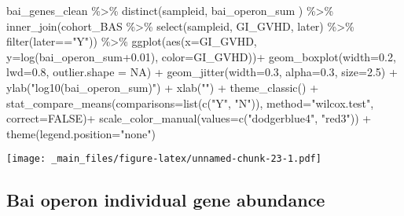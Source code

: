 \documentclass[
]{book}
\newenvironment{Shaded}{\begin{snugshade}}{\end{snugshade}}
\newcommand{\AttributeTok}[1]{\textcolor[rgb]{0.77,0.63,0.00}{#1}}
\newcommand{\ConstantTok}[1]{\textcolor[rgb]{0.00,0.00,0.00}{#1}}
\newcommand{\FloatTok}[1]{\textcolor[rgb]{0.00,0.00,0.81}{#1}}
\newcommand{\FunctionTok}[1]{\textcolor[rgb]{0.00,0.00,0.00}{#1}}
\newcommand{\NormalTok}[1]{#1}
\newcommand{\SpecialCharTok}[1]{\textcolor[rgb]{0.00,0.00,0.00}{#1}}
\newcommand{\StringTok}[1]{\textcolor[rgb]{0.31,0.60,0.02}{#1}}
\begin{document}
\begin{Shaded}
\begin{Highlighting}[]
\NormalTok{bai\_genes\_clean }\SpecialCharTok{\%\textgreater{}\%} 
  \FunctionTok{distinct}\NormalTok{(sampleid, bai\_operon\_sum ) }\SpecialCharTok{\%\textgreater{}\%} 
  \FunctionTok{inner\_join}\NormalTok{(cohort\_BAS }\SpecialCharTok{\%\textgreater{}\%} \FunctionTok{select}\NormalTok{(sampleid, GI\_GVHD, later) }\SpecialCharTok{\%\textgreater{}\%} \FunctionTok{filter}\NormalTok{(later}\SpecialCharTok{==}\StringTok{"Y"}\NormalTok{)) }\SpecialCharTok{\%\textgreater{}\%} 
  \FunctionTok{ggplot}\NormalTok{(}\FunctionTok{aes}\NormalTok{(}\AttributeTok{x=}\NormalTok{GI\_GVHD, }\AttributeTok{y=}\FunctionTok{log}\NormalTok{(bai\_operon\_sum}\FloatTok{+0.01}\NormalTok{), }\AttributeTok{color=}\NormalTok{GI\_GVHD))}\SpecialCharTok{+}
  \FunctionTok{geom\_boxplot}\NormalTok{(}\AttributeTok{width=}\FloatTok{0.2}\NormalTok{, }\AttributeTok{lwd=}\FloatTok{0.8}\NormalTok{, }\AttributeTok{outlier.shape =} \ConstantTok{NA}\NormalTok{) }\SpecialCharTok{+}
  \FunctionTok{geom\_jitter}\NormalTok{(}\AttributeTok{width=}\FloatTok{0.3}\NormalTok{, }\AttributeTok{alpha=}\FloatTok{0.3}\NormalTok{, }\AttributeTok{size=}\FloatTok{2.5}\NormalTok{) }\SpecialCharTok{+}
  \FunctionTok{ylab}\NormalTok{(}\StringTok{"log10(bai\_operon\_sum)"}\NormalTok{) }\SpecialCharTok{+}
  \FunctionTok{xlab}\NormalTok{(}\StringTok{""}\NormalTok{) }\SpecialCharTok{+}
  \FunctionTok{theme\_classic}\NormalTok{() }\SpecialCharTok{+}
  \FunctionTok{stat\_compare\_means}\NormalTok{(}\AttributeTok{comparisons=}\FunctionTok{list}\NormalTok{(}\FunctionTok{c}\NormalTok{(}\StringTok{"Y"}\NormalTok{, }\StringTok{"N"}\NormalTok{)),}
                     \AttributeTok{method=}\StringTok{"wilcox.test"}\NormalTok{,}
                     \AttributeTok{correct=}\ConstantTok{FALSE}\NormalTok{)}\SpecialCharTok{+}
  \FunctionTok{scale\_color\_manual}\NormalTok{(}\AttributeTok{values=}\FunctionTok{c}\NormalTok{(}\StringTok{"dodgerblue4"}\NormalTok{, }\StringTok{"red3"}\NormalTok{)) }\SpecialCharTok{+}
  \FunctionTok{theme}\NormalTok{(}\AttributeTok{legend.position=}\StringTok{"none"}\NormalTok{)}
\end{Highlighting}
\end{Shaded}

\texttt{[image: \_main\_files/figure-latex/unnamed-chunk-23-1.pdf]}

\hypertarget{bai-operon-individual-gene-abundance}{%
\subsection{Bai operon individual gene abundance}\label{bai-operon-individual-gene-abundance}}
\end{document}
